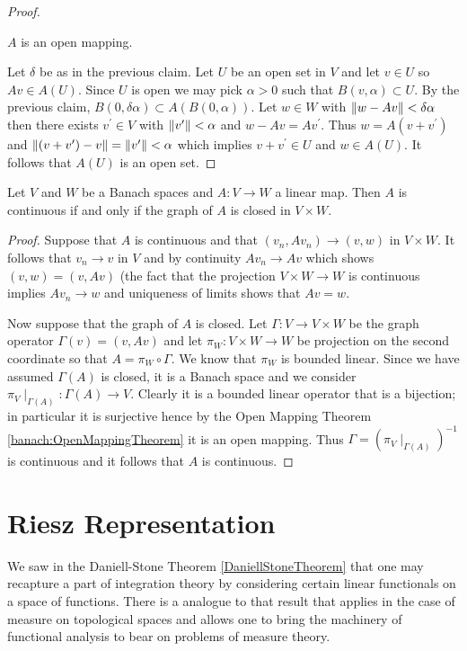 \begin{proof}
\begin{clm}$A$ is an open mapping.
\end{clm}
Let $\delta$ be as in the previous claim.  Let $U$ be an open set in $V$ and let $v \in U$ so $Av \in A(U)$.  Since $U$ is open we may pick $\alpha>0$ such that $B(v, \alpha) \subset U$.  By the previous claim, $B(0, \delta \alpha) \subset A(B(0,\alpha))$.  Let $w \in W$ with $\left \lVert w - Av \right \rVert < \delta \alpha$ then there exists $v^\prime \in V$ with $\left \lVert v^\prime \right \rVert < \alpha$ and $w - Av = A v^\prime$. Thus $w = A(v + v^\prime)$ and $\left \lVert (v + v^\prime) - v  \right \rVert = \left \lVert v^\prime \right \rVert < \alpha$ which implies $v+v^\prime \in U$ and $w \in A(U)$.  It follows that $A(U)$ is an open set.
\end{proof}

\begin{thm}\label{banach:ClosedGraphTheorem}Let $V$ and $W$ be a Banach spaces and $A : V \to W$ a linear map.  Then $A$ is continuous if and only if the graph of $A$ is closed in $V \times W$.
\end{thm}
\begin{proof}
Suppose that $A$ is continuous and that $(v_n, A v_n) \to (v,w)$ in $V \times W$.  It follows that $v_n \to v$ in $V$ and by continuity $A v_n \to A v$ which shows $(v,w) = (v, A v)$ (the fact that the projection $V \times W \to W$ is continuous implies $A v_n \to w$ and uniqueness of limits shows that $Av = w$.

Now suppose that the graph of $A$ is closed.  Let $\Gamma : V \to V \times W$ be the graph operator $\Gamma(v) = (v, Av)$ and let $\pi_W : V \times W \to W$ be projection on the second coordinate so that $A = \pi_W \circ \Gamma$.  We know that $\pi_W$ is bounded linear.  Since we have assumed $\Gamma(A)$ is closed, it is a Banach space and we consider $\pi_V \mid_{\Gamma(A)} : \Gamma(A) \to V$.  Clearly it is a bounded linear operator that is a bijection; in particular it is surjective hence by the Open Mapping Theorem \ref{banach:OpenMappingTheorem} it is an open mapping.  Thus $\Gamma = (\pi_V \mid_{\Gamma(A)})^{-1}$ is continuous and it follows that $A$ is continuous.
\end{proof}

\section{Riesz Representation}

We saw in the Daniell-Stone Theorem \ref{DaniellStoneTheorem} that one
may recapture a part of integration theory by considering certain
linear functionals on a space of functions.  There is a analogue to
that result that applies in the case of measure on topological
spaces and allows one to bring the machinery of functional analysis to
bear on problems of measure theory.  

